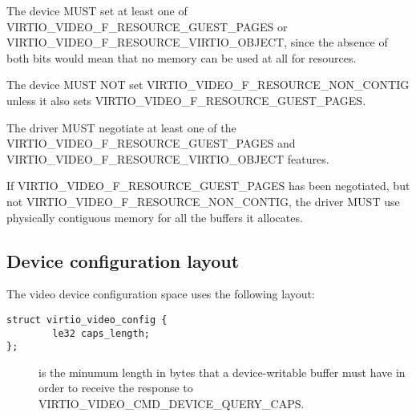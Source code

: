 
The device MUST set at least one of
VIRTIO_VIDEO_F_RESOURCE_GUEST_PAGES or
VIRTIO_VIDEO_F_RESOURCE_VIRTIO_OBJECT, since the absence of both
bits would mean that no memory can be used at all for resources.

The device MUST NOT set VIRTIO_VIDEO_F_RESOURCE_NON_CONTIG unless
it also sets VIRTIO_VIDEO_F_RESOURCE_GUEST_PAGES.


The driver MUST negotiate at least one of the
VIRTIO_VIDEO_F_RESOURCE_GUEST_PAGES and
VIRTIO_VIDEO_F_RESOURCE_VIRTIO_OBJECT features.

If VIRTIO_VIDEO_F_RESOURCE_GUEST_PAGES has been negotiated, but not
VIRTIO_VIDEO_F_RESOURCE_NON_CONTIG, the driver MUST use physically
contiguous memory for all the buffers it allocates.

\subsection{Device configuration layout}\label{sec:Device Types / Video Device / Device configuration layout}

The video device configuration space uses the following layout:

\begin{lstlisting}
struct virtio_video_config {
        le32 caps_length;
};
\end{lstlisting}

\begin{description}
\item[]
is the minumum length in bytes that a device-writable buffer must have
in order to receive the response to
VIRTIO_VIDEO_CMD_DEVICE_QUERY_CAPS.
\end{description}


